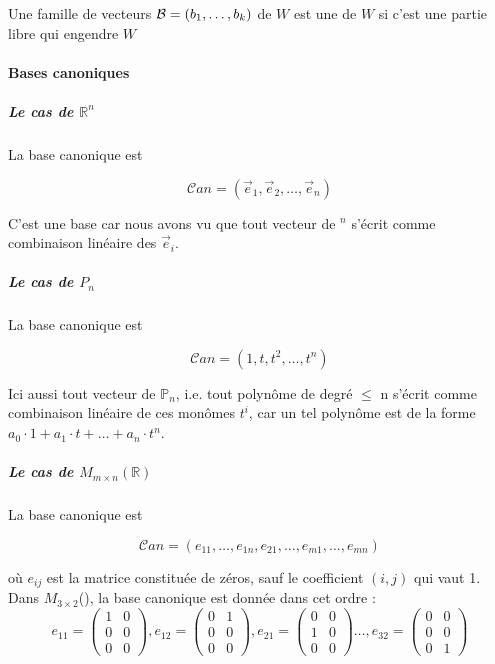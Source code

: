 \begin{definition}
    Une famille  de vecteurs $\mathcal{B} = (b_1, \dots, b_k)$ de $W$ est une  de $W$ si c'est une partie libre qui engendre $W$ 
\end{definition}

\paragraph{Bases canoniques}

\subparagraph{Le cas de $\mathbb{R}^n$}
La base canonique est 
\begin{formule}

\[
\mathcal{C}an = (\vec{e}_1, \vec{e}_2, \ldots, \vec{e}_n)
\]
\end{formule}
C'est une base car nous avons vu que tout vecteur de \R$^n$ s'écrit comme combinaison linéaire des $\vec{e}_i$.
\\
\subparagraph{Le cas de $P_n$}
La base canonique est 
\begin{formule}
    

\[
\mathcal{C}an = (1, t, t^2, \ldots, t^n)
\]
\end{formule}
Ici aussi tout vecteur de $\mathbb{P}_n$, i.e. tout polynôme de degré $\leq$ n s'écrit comme combinaison linéaire de ces monômes $t^i$, car un tel polynôme est de la forme $a_0\cdot 1 + a_1\cdot t + \dots + a_n\cdot t^n$.
\subparagraph{Le cas de $M_{m \times n}(\mathbb{R})$}
La base canonique est 
\begin{formule}
\[
\mathcal{C}an = (e_{11}, \ldots, e_{1n}, e_{21}, \ldots, e_{m1}, \ldots, e_{mn})
\]
\end{formule}
où $e_{ij}$ est la matrice constituée de zéros, sauf le coefficient $(i, j)$ qui vaut 1. Dans $M_{3\times 2}$(\R), la base canonique est donnée dans cet ordre :
\\
\[e_{11} = \begin{pmatrix}
    1 & 0\\
    0 & 0 \\
    0 & 0
\end{pmatrix}, e_{12} = \begin{pmatrix}
    0 & 1 \\ 0 & 0 \\ 0 & 0
\end{pmatrix}, e_{21} = \begin{pmatrix}
    0 & 0 \\ 1 & 0 \\ 0 & 0
\end{pmatrix} \dots, e_{32} = \begin{pmatrix}
    0 & 0 \\ 0 & 0 \\ 0 & 1
\end{pmatrix} \]

